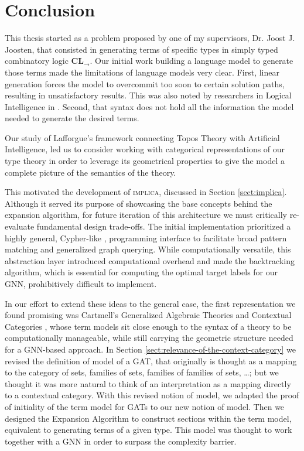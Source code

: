 
\chapter*{Conclusion}

This thesis started as a problem proposed by one of my supervisors, Dr. Joost J. Joosten, that consisted in generating 
terms of specific types in simply typed combinatory logic $\textbf{CL}_\to$.
Our initial work building a language model to generate those terms made the limitations of language models very clear.
First, linear generation forces the model to overcommit too soon to certain solution paths, resulting in unsatisfactory results. 
This was also noted by researchers in Logical Intelligence in \cite{logicalintelligence}.
Second, that syntax does not hold all the information the model needed to generate the desired terms.

Our study of Lafforgue's framework \cite{lafforgue2022, lafforgue2024} 
connecting Topos Theory \cite{lawvere1971} with Artificial 
Intelligence, led us to consider working with categorical representations 
of our type theory in order to leverage its geometrical properties to 
give the model a complete picture of the semantics of the theory.

This motivated the development of \textsc{implica}, discussed in Section \ref{sect:implica}. 
Although it served its purpose of showcasing the base concepts behind the expansion algorithm,
for future iteration of this architecture we must critically re-evaluate fundamental design trade-offs.
The initial implementation prioritized a highly general, Cypher-like \cite{francis2018}, programming interface
to facilitate broad pattern matching and generalized graph querying. While computationally
versatile, this abstraction layer introduced computational overhead and made the backtracking algorithm,
which is essential for computing the optimal target labels for our GNN, prohibitively difficult to implement.

In our effort to extend these ideas to the general case, the first representation we found promising was Cartmell's Generalized Algebraic
Theories and Contextual Categories \cite{cartmell1978, cartmell1986}, whose term models
sit close enough to the syntax of a theory to be
computationally manageable, while still carrying the 
geometric structure needed for a GNN-based approach. 
In Section \ref{sect:relevance-of-the-context-category} we revised the definition of model of a GAT, that originally is thought as a mapping to the category of sets, families of sets, families of families of sets, \dots;
but we thought it was more natural to think of an interpretation as a mapping directly to a contextual category.
With this revised notion of model, we adapted the proof of initiality of the term model for GATs to our new notion of model.
Then we designed the Expansion Algorithm to construct sections within the term model, equivalent to generating terms of a given type.
This model was thought to work together with a GNN in order to surpass the 
complexity barrier.

